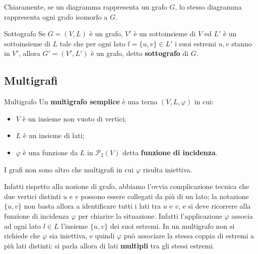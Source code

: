 \begin{osservation}
	Chiaramente, se un diagramma rappresenta un grafo $G$, lo stesso diagramma rappresenta ogni grafo isomorfo a $G$.
\end{osservation}

\begin{defbox}{Sottografo}
	Se $G=(V,L)$ è un grafo, $V'$ è un sottoinsieme di $V$ ed $L'$ è un sottoinsieme di $L$ tale che per ogni lato $l=\{u,v\} \in L'$ i suoi estremi $u,v$ stanno in $V'$, allora $G'=(V',L')$ è un grafo, detto \textbf{sottografo} di $G$. 
\end{defbox}
\subsection{Multigrafi}

\begin{defbox}{Multigrafo}
	Un \textbf{multigrafo semplice} è una terna $(V,L,\varphi)$ in cui:
	\begin{itemize}
		\item $V$ è un insieme non vuoto di vertici;
		\item $L$ è un insieme di lati;
		\item $\varphi$ è una funzione da $L$ in $\mathcal{P}_{2}(V)$ detta \textbf{funzione di incidenza}.
	\end{itemize}
\end{defbox}

\begin{osservation}
	I grafi non sono altro che multigrafi in cui $\varphi$ risulta iniettiva.
\end{osservation}

Infatti rispetto alla nozione di grafo, abbiamo l'ovvia complicazione tecnica che due vertici distinti $u$ e $v$ possono essere collegati da più di un lato; la notazione $\{u, v\}$ non basta allora a identificare tutti i lati tra $u$ e $v$, e si deve ricorrere alla funzione di incidenza $\varphi$ per chiarire la situazione. Infatti l'applicazione $\varphi$ associa ad ogni lato $l \in L$  l'insieme $\{u, v\}$ dei suoi estremi. In un multigrafo non si richiede che $\varphi$ sia iniettiva, e quindi $\varphi$ può associare la stessa coppia di estremi a più lati distinti: si parla allora di lati \textbf{multipli} tra gli stessi estremi.

